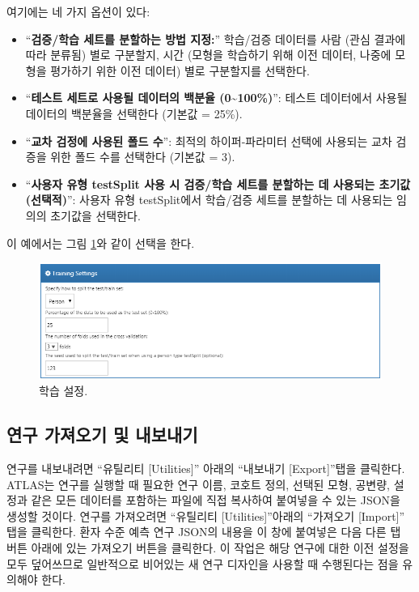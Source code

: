 \documentclass[11pt]{book}
\providecommand{\tightlist}{%
  \setlength{\itemsep}{0pt}\setlength{\parskip}{0pt}}
\theoremstyle{definition}
\theoremstyle{definition}
\theoremstyle{definition}
\theoremstyle{remark}
\begin{document}
여기에는 네 가지 옵션이 있다:

\begin{itemize}
\tightlist
\item
  ``\textbf{검증/학습 세트를 분할하는 방법 지정:}'' 학습/검증 데이터를
  사람 (관심 결과에 따라 분류됨) 별로 구분할지, 시간 (모형을 학습하기
  위해 이전 데이터, 나중에 모형을 평가하기 위한 이전 데이터) 별로
  구분할지를 선택한다.
\item
  ``\textbf{테스트 세트로 사용될 데이터의 백분율
  (0\textasciitilde{}100\%)}'': 테스트 데이터에서 사용될 데이터의
  백분율을 선택한다 (기본값 = 25\%).
\item
  ``\textbf{교차 검정에 사용된 폴드 수}'': 최적의 하이퍼-파라미터 선택에
  사용되는 교차 검증을 위한 폴드 수를 선택한다 (기본값 = 3).
\item
  ``\textbf{사용자 유형 testSplit 사용 시 검증/학습 세트를 분할하는 데
  사용되는 초기값 (선택적)}'': 사용자 유형 testSplit에서 학습/검증
  세트를 분할하는 데 사용되는 임의의 초기값을 선택한다.
\end{itemize}

이 예에서는 그림 \ref{fig:trainingSettings}와 같이 선택을 한다.

\begin{figure}

{\centering \includegraphics[width=1\linewidth]{images/PatientLevelPrediction/trainingSettings} 

}

\caption{학습 설정.}\label{fig:trainingSettings}
\end{figure}

\subsection{연구 가져오기 및 내보내기}\label{---}

연구를 내보내려면 ``유틸리티 {[}Utilities{]}'' 아래의 ``내보내기
{[}Export{]}''탭을 클릭한다. ATLAS는 연구를 실행할 때 필요한 연구 이름,
코호트 정의, 선택된 모형, 공변량, 설정과 같은 모든 데이터를 포함하는
파일에 직접 복사하여 붙여넣을 수 있는 JSON을 생성할 것이다. 연구를
가져오려면 ``유틸리티 {[}Utilities{]}''아래의 ``가져오기 {[}Import{]}''
탭을 클릭한다. 환자 수준 예측 연구 JSON의 내용을 이 창에 붙여넣은 다음
다른 탭 버튼 아래에 있는 가져오기 버튼을 클릭한다. 이 작업은 해당 연구에
대한 이전 설정을 모두 덮어쓰므로 일반적으로 비어있는 새 연구 디자인을
사용할 때 수행된다는 점을 유의해야 한다.
\end{document}

